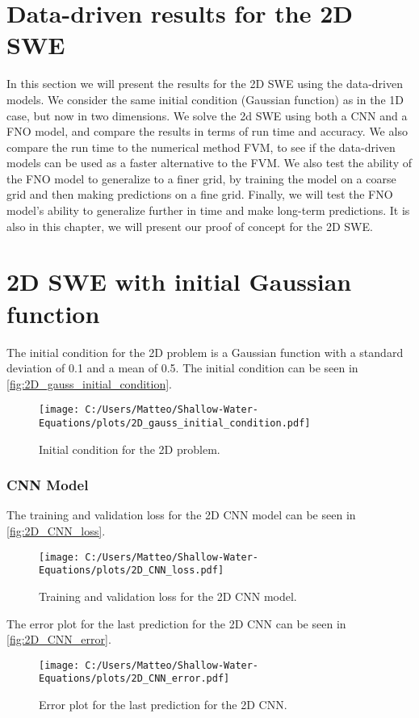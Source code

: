 \section{Data-driven results for the 2D SWE}\label{sec:data-driven-results-2D}
In this section we will present the results for the 2D SWE using the data-driven models.
We consider the same initial condition (Gaussian function) as in the 1D case, but now in two dimensions.
We solve the 2d SWE using both a CNN and a FNO model, and compare the results in terms of run time and accuracy.
We also compare the run time to the numerical method FVM, to see if the data-driven models can be used as a faster alternative to the FVM.
We also test the ability of the FNO model to generalize to a finer grid, by training the model on a coarse grid and then making predictions on a fine grid.
Finally, we will test the FNO model's ability to generalize further in time and make long-term predictions.
It is also in this chapter, we will present our proof of concept for the 2D SWE. 

\section{2D SWE with initial Gaussian function}
The initial condition for the 2D problem is a Gaussian function with a standard deviation of 0.1 and a mean of 0.5.
The initial condition can be seen in \autoref{fig:2D_gauss_initial_condition}.
\begin{figure}[H]
    \centering
    \texttt{[image: C:/Users/Matteo/Shallow-Water-Equations/plots/2D\_gauss\_initial\_condition.pdf]}
    \caption{Initial condition for the 2D problem.}\label{fig:2D_gauss_initial_condition}
\end{figure}
\subsubsection*{CNN Model}


The training and validation loss for the 2D CNN model can be seen in \autoref{fig:2D_CNN_loss}.
\begin{figure}[H]
    \centering
    \texttt{[image: C:/Users/Matteo/Shallow-Water-Equations/plots/2D\_CNN\_loss.pdf]}
    \caption{Training and validation loss for the 2D CNN model.}\label{fig:2D_CNN_loss}
\end{figure}

The error plot for the last prediction for the 2D CNN can be seen in \autoref{fig:2D_CNN_error}.
\begin{figure}[H]
    \centering
    \texttt{[image: C:/Users/Matteo/Shallow-Water-Equations/plots/2D\_CNN\_error.pdf]}
    \caption{Error plot for the last prediction for the 2D CNN.}\label{fig:2D_CNN_error}
\end{figure}

